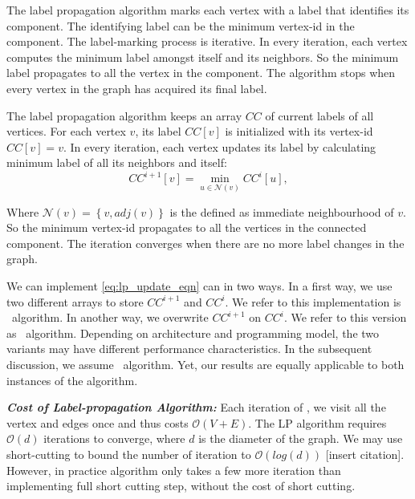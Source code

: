 \begin{table}



\end{table}

The label propagation algorithm marks each vertex with a label that identifies
its component. The identifying label can be the minimum vertex-id in the
component. The label-marking process is iterative. In every iteration, each
vertex computes the minimum label amongst itself and its neighbors. So the
minimum label propagates to all the vertex in the component. The algorithm
stops when every vertex in the graph has acquired its final label.

The label propagation algorithm keeps an array $CC$ of current labels of all
vertices. For each vertex $v$, its label $CC[v]$ is initialized with its
vertex-id $CC[v]=v$. In every iteration, each vertex updates its label by
calculating minimum label of all its neighbors and itself: 
%
\begin{equation}
CC^{i+1}[v]=\min_{u\in\mathcal{N}(v)}CC^{i}[u],\label{eq:lp_update_eqn}
\end{equation}

Where $\mathcal{N}(v)=\left\{ v,adj(v)\right\} $ is the defined as immediate
neighbourhood of $v$. So the minimum vertex-id propagates to all the vertices
in the connected component. The iteration converges when there are no more
label changes in the graph.

We can implement \cref{eq:lp_update_eqn} can in two ways. In a first way, we
use two different arrays to store $CC^{i+1}$ and $CC^{i}$. We refer to this
implementation is \synclp~algorithm. In another way, we overwrite $CC^{i+1}$
on $CC^{i}$. We refer to this version as \asynclp~algorithm. Depending on
architecture and programming model, the two variants may have different
performance characteristics. In the subsequent discussion, we assume
\asynclp~algorithm. Yet, our results are equally applicable to both instances
of the \sv algorithm.

\textbf{\emph{ Cost of Label-propagation Algorithm: }}
Each iteration of \sv, we visit all the vertex and edges once and thus
costs $\mathcal{O}(V+E)$. The LP algorithm requires $\mathcal{O}(d)$
iterations to converge, where $d$ is the diameter of the graph. We
may use short-cutting to bound the number of iteration to $\mathcal{O}(log(d))$
{[}insert citation{]}. However, in practice \asynclp algorithm only
takes a few more iteration than implementing full short cutting step,
without the cost of short cutting. 
